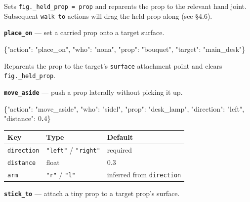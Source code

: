 \documentclass[
  12pt,
  letterpaper,
]{book}
\newenvironment{Shaded}{}{}
\newcommand{\DataTypeTok}[1]{\textcolor[rgb]{0.56,0.13,0.00}{#1}}
\newcommand{\DecValTok}[1]{\textcolor[rgb]{0.25,0.63,0.44}{#1}}
\newcommand{\ErrorTok}[1]{\textcolor[rgb]{1.00,0.00,0.00}{\textbf{#1}}}
\newcommand{\FunctionTok}[1]{\textcolor[rgb]{0.02,0.16,0.49}{#1}}
\newcommand{\StringTok}[1]{\textcolor[rgb]{0.25,0.44,0.63}{#1}}
\begin{document}
Sets \texttt{fig.\_held\_prop\ =\ prop} and reparents the prop to the
relevant hand joint. Subsequent \texttt{walk\_to} actions will drag the
held prop along (see §4.6).

\textbf{\texttt{place\_on}} --- set a carried prop onto a target
surface.

\begin{Shaded}
\begin{Highlighting}[]
\FunctionTok{\{}\DataTypeTok{"action"}\FunctionTok{:} \StringTok{"place\_on"}\FunctionTok{,} \DataTypeTok{"who"}\FunctionTok{:} \StringTok{"nona"}\FunctionTok{,}
 \DataTypeTok{"prop"}\FunctionTok{:} \StringTok{"bouquet"}\FunctionTok{,} \DataTypeTok{"target"}\FunctionTok{:} \StringTok{"main\_desk"}\FunctionTok{\}}
\end{Highlighting}
\end{Shaded}

Reparents the prop to the target's \texttt{surface} attachment point and
clears \texttt{fig.\_held\_prop}.

\textbf{\texttt{move\_aside}} --- push a prop laterally without picking
it up.

\begin{Shaded}
\begin{Highlighting}[]
\FunctionTok{\{}\DataTypeTok{"action"}\FunctionTok{:} \StringTok{"move\_aside"}\FunctionTok{,} \DataTypeTok{"who"}\FunctionTok{:} \StringTok{"sidel"}\FunctionTok{,}
 \DataTypeTok{"prop"}\FunctionTok{:} \StringTok{"desk\_lamp"}\FunctionTok{,} \DataTypeTok{"direction"}\FunctionTok{:} \StringTok{"left"}\FunctionTok{,} \DataTypeTok{"distance"}\FunctionTok{:} \DecValTok{0}\ErrorTok{.}\DecValTok{4}\FunctionTok{\}}
\end{Highlighting}
\end{Shaded}

\begin{longtable}[]{@{}lll@{}}
\toprule\noalign{}
Key & Type & Default \\
\midrule\noalign{}
\endhead
\bottomrule\noalign{}
\endlastfoot
\texttt{direction} & \texttt{"left"} / \texttt{"right"} & required \\
\texttt{distance} & float & 0.3 \\
\texttt{arm} & \texttt{"r"} / \texttt{"l"} & inferred from
\texttt{direction} \\
\end{longtable}

\textbf{\texttt{stick\_to}} --- attach a tiny prop to a target prop's
surface.
\end{document}
